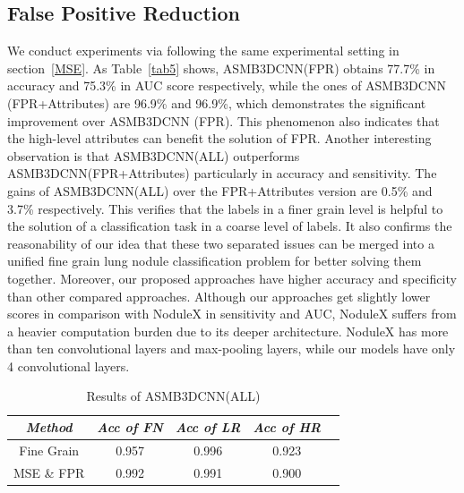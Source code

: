 \documentclass{article}
\begin{document}
\subsection{False Positive Reduction}
\label{FPR}
\vspace{-0.2cm}
We conduct experiments via following the same experimental setting in section~\ref{MSE}. As Table~\ref{tab5} shows, ASMB3DCNN(FPR) obtains 77.7\% in accuracy and 75.3\% in AUC score respectively, while the ones of ASMB3DCNN (FPR+Attributes) are 96.9\% and 96.9\%, which demonstrates the significant improvement over ASMB3DCNN (FPR). This phenomenon also indicates that the high-level attributes can benefit the solution of FPR. Another interesting observation is that ASMB3DCNN(ALL) outperforms ASMB3DCNN(FPR+Attributes) particularly in accuracy and sensitivity. The gains of ASMB3DCNN(ALL) over the FPR+Attributes version are 0.5\% and 3.7\% respectively. This verifies that the labels in a finer grain level is helpful to the solution of a classification task in a coarse level of labels. It also confirms the reasonability of our idea that these two separated issues can be merged into a unified fine grain lung nodule classification problem for better solving them together. Moreover, our proposed approaches have higher accuracy and specificity than other compared approaches. Although our approaches get slightly lower scores in comparison with NoduleX in sensitivity and AUC, NoduleX suffers from a heavier computation burden due to its deeper architecture. NoduleX has more than ten convolutional layers and max-pooling layers, while our models have only 4 convolutional layers.
\begin{table}[htbp]
\setlength{\abovecaptionskip}{0.cm}
\setlength{\belowcaptionskip}{-0.cm}
\vspace{-0.5cm}
\caption{Results of ASMB3DCNN(ALL)}
\begin{center}
\begin{tabular}{|c|c|c|c|c|}
\hline
\textbf{\textit{Method}}& \textbf{\textit{Acc of FN}}& \textbf{\textit{Acc of LR}}& \textbf{\textit{Acc of HR}}  \\
\hline
Fine Grain & 0.957 & 0.996 & 0.923\\
MSE \& FPR & 0.992 & 0.991 & 0.900\\
\hline
\end{tabular}
\label{tab6}
\vspace{-0.5cm}
\end{center}
\end{table}
\end{document}
